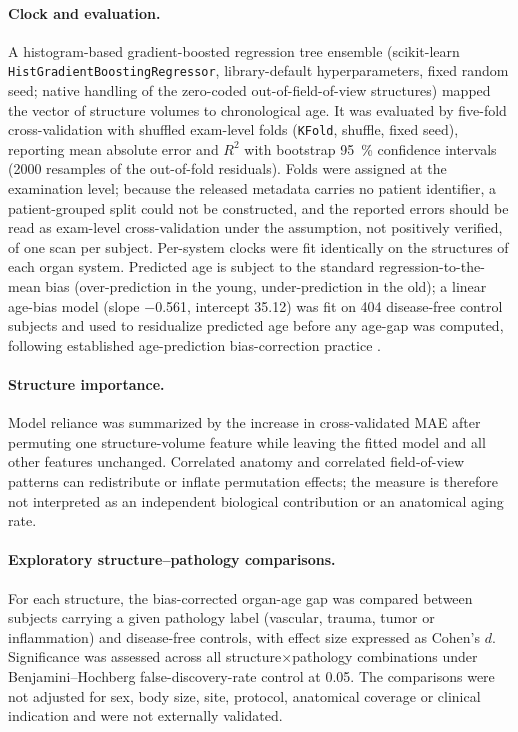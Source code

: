 \documentclass[11pt]{article}
\begin{document}
\paragraph{Clock and evaluation.} A histogram-based gradient-boosted regression
tree ensemble (scikit-learn \texttt{HistGradientBoostingRegressor}, library-default
hyperparameters, fixed random seed; native handling of the zero-coded out-of-field-of-view
structures) mapped the vector of structure volumes to chronological age. It was evaluated by
five-fold cross-validation with shuffled exam-level folds (\texttt{KFold}, shuffle, fixed
seed), reporting mean absolute error and $R^2$ with bootstrap \SI{95}{\percent} confidence
intervals (\num{2000} resamples of the out-of-fold residuals). Folds were assigned at the
examination level; because the released metadata carries no patient identifier, a
patient-grouped split could not be constructed, and the reported errors should be read as
exam-level cross-validation under the assumption, not positively verified, of one scan
per subject. Per-system clocks were fit identically on the structures of each organ system. Predicted age is subject to the
standard regression-to-the-mean bias (over-prediction in the young,
under-prediction in the old); a linear age-bias model (slope \num{-0.561},
intercept \num{35.12}) was fit on \num{404} disease-free control subjects and
used to residualize predicted age before any age-gap was computed, following
established age-prediction bias-correction practice
\citep{delange2020correction,legoallec2022abdominal}.

\paragraph{Structure importance.} Model reliance was summarized by the increase
in cross-validated MAE after permuting one structure-volume feature while
leaving the fitted model and all other features unchanged. Correlated anatomy
and correlated field-of-view patterns can redistribute or inflate permutation
effects; the measure is therefore not interpreted as an independent biological
contribution or an anatomical aging rate.

\paragraph{Exploratory structure--pathology comparisons.} For each structure, the
bias-corrected organ-age gap was compared between subjects carrying a given
pathology label (vascular, trauma, tumor or inflammation) and disease-free
controls, with effect size expressed as Cohen's $d$. Significance was assessed
across all structure$\times$pathology combinations under Benjamini--Hochberg
false-discovery-rate control at \num{0.05}. The comparisons were not adjusted
for sex, body size, site, protocol, anatomical coverage or clinical indication
and were not externally validated.
\end{document}

